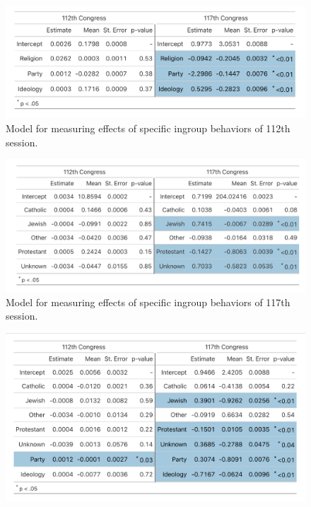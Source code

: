 \documentclass[Royal,times,sageh]{sagej}
\begin{document}
\begin{figure}

{\centering \includegraphics[width=0.7\linewidth]{images/final_model1} 

}

\caption{Model for measuring effects of specific ingroup behaviors of 112th session. \label{table3}}\label{fig:table3}
\end{figure}

\begin{figure}

{\centering \includegraphics[width=0.7\linewidth]{images/final_model2} 

}

\caption{Model for measuring effects of specific ingroup behaviors of 117th session.\label{table4}}\label{fig:table4}
\end{figure}

\begin{figure}
\includegraphics[width=1\linewidth]{images/final_model3} \caption{\label{fig:plot}}\label{fig:plot-ref}
\end{figure}



\end{document}
